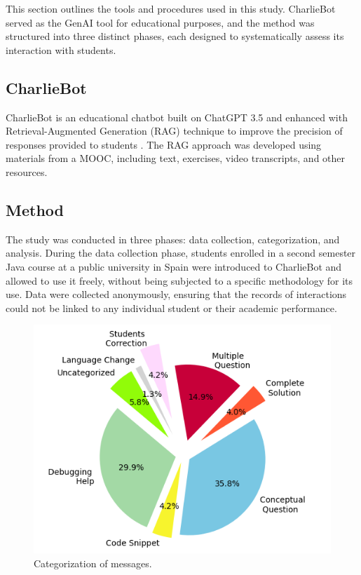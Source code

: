 \documentclass[a4paper,twoside]{article}
\begin{document}
This section outlines the tools and procedures used in this study. CharlieBot
served as the GenAI tool for educational purposes, and the method was structured
into three distinct phases, each designed to systematically assess its
interaction with students.

\subsection{CharlieBot}

CharlieBot is an educational chatbot built on ChatGPT 3.5 and enhanced with
Retrieval-Augmented Generation (RAG) technique to improve the precision of
responses provided to students \cite{Sun24}. The RAG approach was developed
using materials from a MOOC, including text, exercises, video transcripts, and
other resources.

\subsection{Method}

The study was conducted in three phases: data collection,
categorization, and analysis. During the data collection phase, students
enrolled in a second semester Java course at a public university in Spain were
introduced to CharlieBot and allowed to use it freely, without being subjected
to a specific methodology for its use. Data were collected anonymously, ensuring
that the records of interactions could not be linked to any individual student
or their academic performance.

\begin{figure}[h!]
  \centering
  \includegraphics[scale=0.62]{img/figure1.png}
  \caption{Categorization of messages.}
  \label{fig:graph1}
\end{figure}
\end{document}
